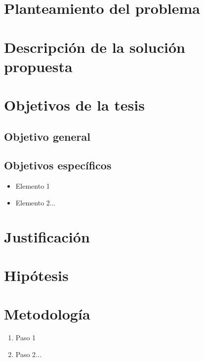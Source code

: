 \label{chap:intro}

\section{Planteamiento del problema}

    \lipsum[17]

\section{Descripción de la solución propuesta}

    \lipsum[17]

\section{Objetivos de la tesis}

    \subsection*{Objetivo general}
         
    \subsection*{Objetivos específicos}

        \begin{itemize}
            \item Elemento 1
            \item Elemento 2...
        \end{itemize}
    
\section{Justificación}

    \lipsum[17]

\section{Hipótesis}
    
    \lipsum[17]

\section{Metodología}

    \begin{enumerate}
        \item Paso 1
        \item Paso 2...
    \end{enumerate}


